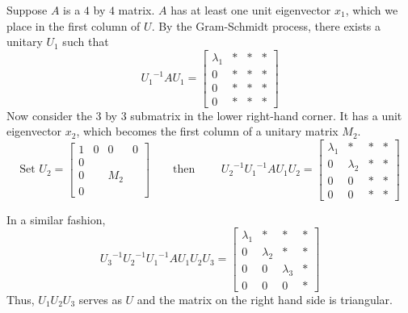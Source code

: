 \documentclass{article}
\begin{document}
\medskip
Suppose $A$ is a $4$ by $4$ matrix.
$A$ has at least one unit eigenvector $x_1$, which we place in the first column of $U$.
By the Gram-Schmidt process, there exists a unitary $U_1$ such that
$${U_1}^{-1}AU_1=
\begin{bmatrix}
\lambda_1 &*&*&*\\
0&*&*&*\\
0&*&*&*\\
0&*&*&*
\end{bmatrix}$$
Now consider the $3$ by $3$ submatrix in the lower right-hand corner.
It has a unit eigenvector $x_2$, which becomes the first column of a unitary matrix $M_2$.
$$\text{Set }
U_2=\begin{bmatrix}
1&0&0&0\\
0\\
0&&M_2\\
0
\end{bmatrix}
\qquad
\text{then }
\qquad
{U_2}^{-1}{U_1}^{-1}AU_1U_2=
\begin{bmatrix}
\lambda_1 &*&*&*\\
0&\lambda_2&*&*\\
0&0&*&*\\
0&0&*&*
\end{bmatrix}$$

In a similar fashion,
$${U_3}^{-1}{U_2}^{-1}{U_1}^{-1}AU_1U_2U_3=
\begin{bmatrix}
\lambda_1 &*&*&*\\
0&\lambda_2&*&*\\
0&0&\lambda_3&*\\
0&0&0&*
\end{bmatrix}$$
Thus, $U_1U_2U_3$ serves as $U$ and the matrix on the right hand side is triangular.
\end{document}
